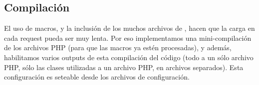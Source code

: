 \subsection{Compilación}

El uso de macros, y la inclusión de los muchos archivos de \PWB, hacen que la carga en cada request pueda ser muy lenta. Por eso implementamos una mini-compilación de los archivos PHP (para que las macros ya estén procesadas), y además, habilitamos varios outputs de esta compilación del código (todo a un sólo archivo PHP, sólo las clases utilizadas a un archivo PHP, en archivos separados). Esta configuración es seteable desde los archivos de configuración.